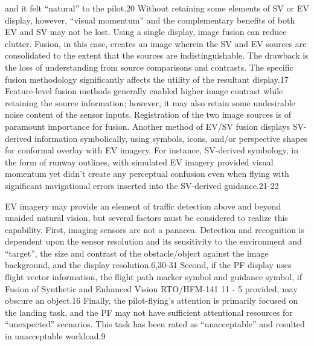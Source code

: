 \documentclass[utf8,bachelor,manualbib]{gradu3}
\begin{document}
and it felt “natural” to the pilot.20 Without retaining some elements of SV or EV display, however,
“visual momentum” and the complementary benefits of both EV and SV may not be lost.
Using a single display, image fusion can reduce clutter. Fusion, in this case, creates an image wherein the SV
and EV sources are consolidated to the extent that the sources are indistinguishable. The drawback is the loss
of understanding from source comparisons and contrasts. The specific fusion methodology significantly
affects the utility of the resultant display.17 Feature-level fusion methods generally enabled higher image
contrast while retaining the source information; however, it may also retain some undesirable noise content of
the sensor inputs. Registration of the two image sources is of paramount importance for fusion.
Another method of EV/SV fusion displays SV-derived information symbolically, using symbols, icons, and/or
perspective shapes for conformal overlay with EV imagery. For instance, SV-derived symbology, in the form
of runway outlines, with simulated EV imagery provided visual momentum yet didn’t create any perceptual
confusion even when flying with significant navigational errors inserted into the SV-derived guidance.21-22 \citep{baileyym2007}




EV imagery may provide an element of traffic detection above and beyond unaided natural vision, but several
factors must be considered to realize this capability. First, imaging sensors are not a panacea. Detection and
recognition is dependent upon the sensor resolution and its sensitivity to the environment and “target”, the
size and contrast of the obstacle/object against the image background, and the display resolution.6,30-31 Second,
if the PF display uses flight vector information, the flight path marker symbol and guidance symbol, if
Fusion of Synthetic and Enhanced Vision
RTO/HFM-141 11 - 5
provided, may obscure an object.16 Finally, the pilot-flying’s attention is primarily focused on the landing
task, and the PF may not have sufficient attentional resources for “unexpected” scenarios. This task has been
rated as “unacceptable” and resulted in unacceptable workload.9 \citep{baileyym2007}
\end{document}
